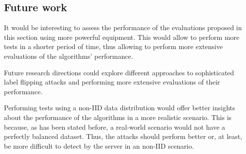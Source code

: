 
\subsection{Future work}
It would be interesting to assess the performance of the evaluations proposed in this section using more powerful equipment. This would allow to perform more tests in a shorter period of time, thus allowing to perform more extensive evaluations of the algorithms' performance.

Future research directions could explore different approaches to sophisticated label flipping attacks and performing more extensive evaluations of their performance.

Performing tests using a non-IID data distribution would offer better insights about the performance of the algorithms in a more realistic scenario.
This is because, as has been stated before, a real-world scenario would not have a perfectly balanced dataset. Thus, the attacks should perform better or, at least, be more difficult to detect by the server in an non-IID scenario.
\pagebreak